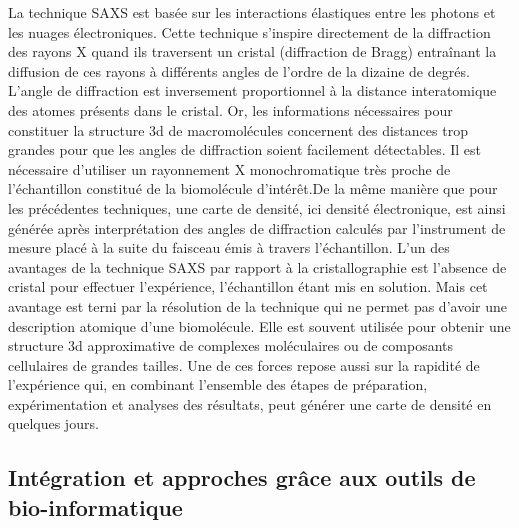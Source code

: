 La technique SAXS est basée sur les interactions élastiques entre les photons et les nuages électroniques. Cette technique s'inspire directement de la diffraction des rayons X quand ils traversent un cristal (diffraction de Bragg) entraînant la diffusion de ces rayons à différents angles de l'ordre de la dizaine de degrés. L'angle de diffraction est inversement proportionnel à la distance interatomique des atomes présents dans le cristal. Or, les informations nécessaires pour constituer la structure 3d de macromolécules concernent des distances trop grandes pour que les angles de diffraction soient facilement détectables. Il est nécessaire d'utiliser un rayonnement X monochromatique très proche de l'échantillon constitué de la biomolécule d'intérêt.De la même manière que pour les précédentes techniques, une carte de densité, ici densité électronique, est ainsi générée après interprétation des angles de diffraction calculés par l'instrument de mesure placé à la suite du faisceau émis à travers l'échantillon.
L'un des avantages de la technique SAXS par rapport à la cristallographie est l'absence de cristal pour effectuer l'expérience, l'échantillon étant mis en solution. Mais cet avantage est terni par la résolution de la technique qui ne permet pas d'avoir une description atomique d'une biomolécule. Elle est souvent utilisée pour obtenir une structure 3d approximative de complexes moléculaires ou de composants cellulaires de grandes tailles. Une de ces forces repose aussi sur la rapidité de l'expérience qui, en combinant l'ensemble des étapes de préparation, expérimentation et analyses des résultats, peut générer une carte de densité en quelques jours.

\subsection{Intégration et approches grâce aux outils de bio-informatique}



